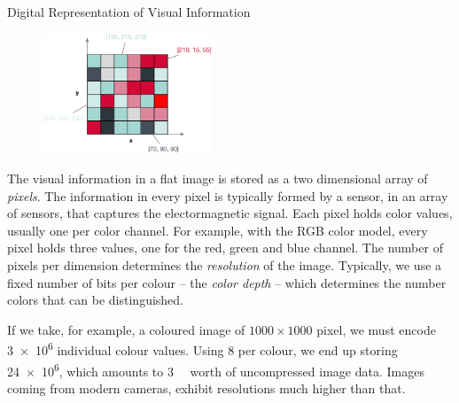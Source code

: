 \begin{example}[label=example:representation_visual_information]{Digital Representation of Visual Information}{}
    \begin{figure}
        \includegraphics[width=0.45\textwidth]{figures/example-visual-signal.eps}
    \end{figure}
    The visual information in a flat image is stored as a two dimensional array of \emph{pixels}. The information in every pixel is typically formed by a sensor, in an array of sensors, that captures the electormagnetic signal. Each pixel holds color values, usually one per color channel. For example, with the RGB color model, every pixel holds three values, one for the red, green and blue channel. The number of pixels per dimension determines the \emph{resolution} of the image. Typically, we use a fixed number of bits per colour -- the \emph{color depth} -- which determines the number colors that can be distinguished.

    If we take, for example, a coloured image of $1000 \times 1000$ pixel, we must encode \num{3e6} individual colour values. Using \SI{8}{\bit} per colour, we end up storing \SI{24e6}{\bit}, which amounts to \SI{3}{\mega\byte} worth of uncompressed image data. Images coming from modern cameras, exhibit resolutions much higher than that.
\end{example}


